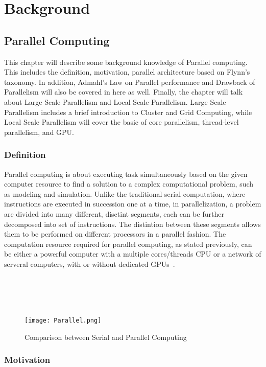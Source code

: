 \chapter{Background}

\section{Parallel Computing}

This chapter will describe some background knowledge of Parallel computing. This includes the definition, motivation, parallel architecture based on Flynn's taxonomy. In addition, Admahl's Law on Parallel performance and Drawback of Parallelism will also be covered in here as well. Finally, the chapter will talk about Large Scale Parallelism and Local Scale Parallelism. Large Scale Parallelism includes a brief introduction to Cluster and Grid Computing, while Local Scale Parallelism will cover the basic of core parallelism, thread-level parallelism, and GPU. \\

\subsection{Definition}

Parallel computing is about executing task simultaneously based on the given computer resource to find a solution to a complex computational problem, such as modeling and simulation. Unlike the traditional serial computation, where instructions are executed in succession one at a time, in parallelization, a problem are divided into many different, disctint segments, each can be further decomposed into set of instructions. The distintion between these segments allows them to be performed on different processors in a parallel fashion. The computation resource required for parallel computing, as stated previously, can be either a powerful computer with a multiple cores/threads CPU or a network of serveral computers, with or without dedicated GPUs~\cite{intro_parallel}. \\
~\\
~\\
~\\
~\\
\begin{figure}[H]
\texttt{[image: Parallel.png]}
\centering
\caption{Comparison between Serial and Parallel Computing}
\end{figure}

\subsection{Motivation}

